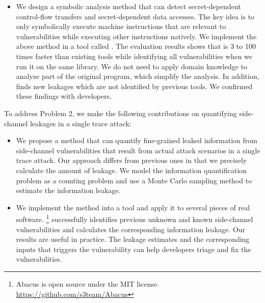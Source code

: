 \begin{itemize}
    \item We design a symbolic analysis method that can detect secret-dependent control-flow transfers and secret-dependent data accesses. The key idea is to only symbolically execute machine instructions that are relevant to vulnerabilities while executing other instructions natively. We implement the above method in a tool called \detect{}. The evaluation results shows that \detect{} is 3 to 100 times faster than existing tools while identifying all vulnerabilities when we run it on the same library.  We do not need to apply domain knowledge to analyze part of the original program, which simplify the analysis. In addition, \detect{} finds new leakages which are not identified by previous tools. We confirmed these findings with developers.
\end{itemize}

To address Problem 2, we make the following contributions on quantifying side-channel leakages in a single trace attack:


\begin{itemize}
    \item We propose a method that can quantify fine-grained leaked information from side-channel vulnerabilities that result from actual attack scenarios in a single trace attack. Our approach differs from previous ones in that we precisely calculate the amount of leakage. We model the information quantification problem as a counting problem and use a Monte Carlo sampling method to estimate the information leakage.
    \item We implement the method into a tool and apply it to several pieces of real software. \tool{}\footnote{Abacus is open source under the MIT license.  \url{https://github.com/s3team/Abacus}} successfully identifies previous unknown and known side-channel vulnerabilities and calculates the corresponding information leakage. Our results are useful in practice. The leakage estimates and the corresponding inputs that triggers the vulnerability can help developers triage and fix the vulnerabilities.
\end{itemize}

